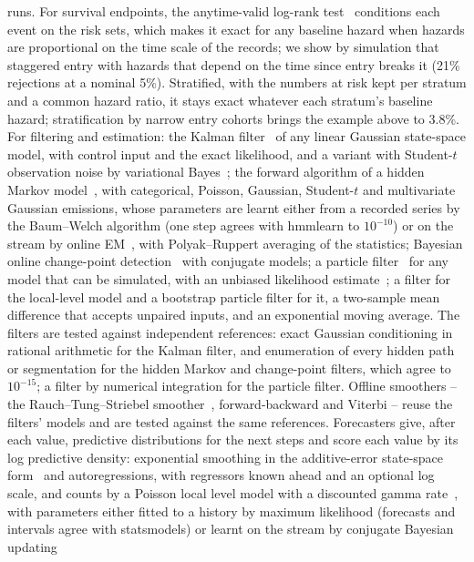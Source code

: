 \documentclass[11pt,a4paper]{article}
\theoremstyle{definition}
\theoremstyle{remark}
\begin{document}
runs. For survival endpoints,
the anytime-valid log-rank test~\cite{terschure2024} conditions each
event on the risk sets, which makes it exact for any baseline hazard when
hazards are proportional on the time scale of the records; we show by
simulation that staggered entry with hazards that depend on the time
since entry breaks it (21\% rejections at a nominal 5\%). Stratified, with
the numbers at risk kept per stratum and a common hazard ratio, it stays
exact whatever each stratum's baseline hazard; stratification by narrow
entry cohorts brings the example above to 3.8\%.
For filtering and
estimation: the Kalman filter~\cite{kalman1960} of any linear Gaussian
state-space model, with control input and the exact likelihood, and a
variant with Student-$t$ observation noise by variational
Bayes~\cite{piche2012}; the forward algorithm of a hidden Markov
model~\cite{rabiner1989}, with categorical, Poisson, Gaussian, Student-$t$
and multivariate Gaussian emissions, whose parameters are learnt either
from a recorded series by the Baum--Welch algorithm (one step agrees
with hmmlearn to $10^{-10}$) or on the stream by online
EM~\cite{cappe2011}, with Polyak--Ruppert averaging of the statistics;
Bayesian online change-point
detection~\cite{adams2007} with conjugate models; a particle
filter~\cite{gordon1993,doucet2001} for any model that can be simulated,
with an unbiased likelihood estimate~\cite{delmoral2004}; a filter for the
local-level model and a bootstrap particle filter for it, a two-sample
mean difference that accepts unpaired inputs, and an exponential moving
average. The filters are tested against independent references: exact
Gaussian conditioning in rational arithmetic for the Kalman filter, and
enumeration of every hidden path or segmentation for the hidden Markov
and change-point filters, which agree to $10^{-15}$; a filter by
numerical integration for the particle filter. Offline smoothers -- the
Rauch--Tung--Striebel smoother~\cite{rauch1965}, forward-backward and
Viterbi -- reuse the filters' models and are tested against the same
references. Forecasters give, after each value, predictive distributions
for the next steps and score each value by its log predictive density:
exponential smoothing in the additive-error state-space
form~\cite{hyndman2008} and autoregressions, with regressors known ahead
and an optional log scale, and counts by a Poisson local level model with
a discounted gamma rate~\cite{harvey1989}, with parameters either
fitted to a history by maximum likelihood (forecasts and intervals agree
with statsmodels) or learnt on the stream by conjugate Bayesian updating
\end{document}
